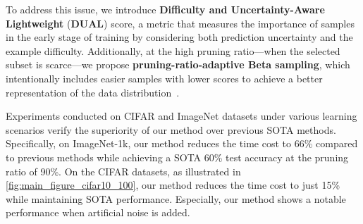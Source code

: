 To address this issue, we introduce \textbf{Difficulty and Uncertainty-Aware Lightweight} (\textbf{DUAL}) score, a metric that measures the importance of samples in the early stage of training by considering both prediction uncertainty and the example difficulty. Additionally, at the high pruning ratio---when the selected subset is scarce---we propose \textbf{pruning-ratio-adaptive Beta sampling}, which intentionally includes easier samples with lower scores to achieve a better representation of the data distribution~\citep{sorscher2022beyond, zheng2022coverage, acharyabalancing}.

Experiments conducted on CIFAR and ImageNet datasets under various learning scenarios verify the superiority of our method over previous SOTA methods.
Specifically, on ImageNet-1k, our method reduces the time cost to 66\% compared to previous methods while achieving a SOTA 60\% test accuracy at the pruning ratio of 90\%. On the CIFAR datasets, as illustrated in \cref{fig:main_figure_cifar10_100}, our method reduces the time cost to just 15\% while maintaining SOTA performance. Especially, our
method shows a notable performance when artificial noise is added.
